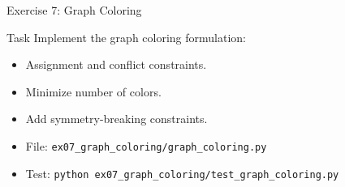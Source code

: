 \documentclass[aspectratio=169,10pt]{beamer}
\begin{document}
\begin{frame}{Exercise 7: Graph Coloring}
\begin{block}{Task}
Implement the graph coloring formulation:
\begin{itemize}
  \item Assignment and conflict constraints.
  \item Minimize number of colors.
  \item Add symmetry-breaking constraints.
\end{itemize}
\end{block}
\begin{itemize}
  \item File: \texttt{ex07\_graph\_coloring/graph\_coloring.py}
  \item Test: \texttt{python ex07\_graph\_coloring/test\_graph\_coloring.py}
\end{itemize}
\end{frame}
\end{document}
